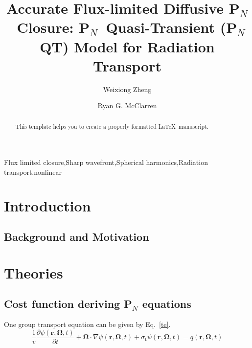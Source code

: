 \documentclass[review]{elsarticle}
\newcommand{\TAMU}{Texas A\&M University}
\begin{document}
\begin{frontmatter}

\title{Accurate Flux-limited Diffusive P$_N$~Closure: P$_N$~Quasi-Transient (P$_N$QT) Model for Radiation Transport}

\author[mymainaddress]{Weixiong Zheng}

\author[mymainaddress]{Ryan G. McClarren}

\address[mymainaddress]{Nuclear Engineering, \TAMU,~College Station, TX 77843-3133}

\begin{abstract}
This template helps you to create a properly formatted \LaTeX\ manuscript.
\end{abstract}

\begin{keyword}
	Flux limited closure\sep Sharp wavefront\sep Spherical harmonics\sep Radiation transport\sep nonlinear
\end{keyword}

\end{frontmatter}

\linenumbers

\section{Introduction}
\subsection{Background and Motivation}

\section{Theories}
\subsection{Cost function deriving P$_N$ equations}
One group transport equation can be given by Eq.~\eqref{te}.
\begin{equation}\label{te}
\frac{1}{v}\frac{\partial\psi(\mathbf{r},\mathbf{\Omega},t)}{\partial t}+\mathbf{\Omega}\cdot\nabla\psi(\mathbf{r},\mathbf{\Omega},t)+\sigma_\mathrm{t}\psi(\mathbf{r},\mathbf{\Omega},t)=q(\mathbf{r},\mathbf{\Omega},t)
\end{equation}
\end{document}
